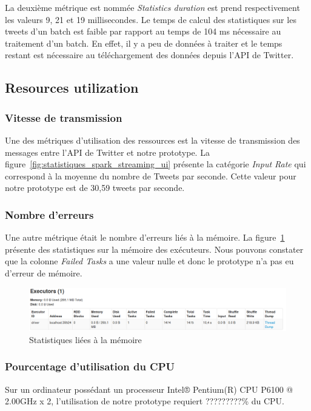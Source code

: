     La deuxième métrique est nommée \emph{Statistics duration} est prend respectivement les valeurs 9, 21 et 19 millisecondes. Le temps de calcul des statistiques sur les tweets d'un batch est faible par rapport au temps de 104 ms nécessaire au traitement d'un batch. En effet, il y a peu de données à traiter et le temps restant est nécessaire au téléchargement des données depuis l'API de Twitter.

  \subsection{Resources utilization}
    \subsubsection{Vitesse de transmission}
      Une des métriques d'utilisation des ressources est la vitesse de transmission des messages entre l'API de Twitter et notre prototype. La figure~\ref{fig:statistiques_spark_streaming_ui} présente la catégorie \emph{Input Rate} qui correspond à la moyenne du nombre de Tweets par seconde. Cette valeur pour notre prototype est de 30,59 tweets par seconde.

    \subsubsection{Nombre d'erreurs}
      Une autre métrique était le nombre d'erreurs liés à la mémoire. La figure~\ref{fig:executor_spark_streaming_ui} présente des statistiques sur la mémoire des exécuteurs. Nous pouvons constater que la colonne \emph{Failed Tasks} a une valeur nulle et donc le prototype n'a pas eu d'erreur de mémoire.

      \begin{figure}
        \centering
        \includegraphics[width=1.0\textwidth]{images/executor_spark_ui.png}
        \caption{Statistiques liées à la mémoire}
        \label{fig:executor_spark_streaming_ui}
      \end{figure}

    \subsubsection{Pourcentage d'utilisation du CPU}
      Sur un ordinateur possédant un processeur Intel® Pentium(R) CPU P6100 @ 2.00GHz x 2, l'utilisation de notre prototype requiert ?????????\% du CPU.

